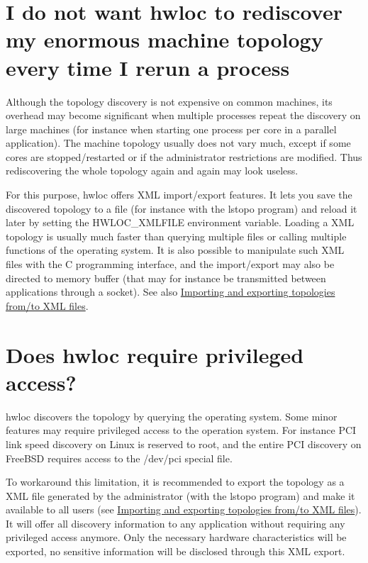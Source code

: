 \hypertarget{a00011_faq_xml}{}\section{I do not want hwloc to rediscover my enormous machine topology every time I rerun a process}\label{a00011_faq_xml}
Although the topology discovery is not expensive on common machines, its overhead may become significant when multiple processes repeat the discovery on large machines (for instance when starting one process per core in a parallel application). The machine topology usually does not vary much, except if some cores are stopped/restarted or if the administrator restrictions are modified. Thus rediscovering the whole topology again and again may look useless.

For this purpose, hwloc offers XML import/export features. It lets you save the discovered topology to a file (for instance with the lstopo program) and reload it later by setting the HWLOC\_\-XMLFILE environment variable. Loading a XML topology is usually much faster than querying multiple files or calling multiple functions of the operating system. It is also possible to manipulate such XML files with the C programming interface, and the import/export may also be directed to memory buffer (that may for instance be transmitted between applications through a socket). See also \hyperlink{a00007}{Importing and exporting topologies from/to XML files}.\hypertarget{a00011_faq_privileged}{}\section{Does hwloc require privileged access?}\label{a00011_faq_privileged}
hwloc discovers the topology by querying the operating system. Some minor features may require privileged access to the operation system. For instance PCI link speed discovery on Linux is reserved to root, and the entire PCI discovery on FreeBSD requires access to the /dev/pci special file.

To workaround this limitation, it is recommended to export the topology as a XML file generated by the administrator (with the lstopo program) and make it available to all users (see \hyperlink{a00007}{Importing and exporting topologies from/to XML files}). It will offer all discovery information to any application without requiring any privileged access anymore. Only the necessary hardware characteristics will be exported, no sensitive information will be disclosed through this XML export.

